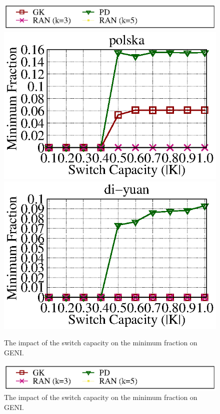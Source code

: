 \documentclass[a4paper,12pt]{report}
\begin{document}
\begin{CJK*}{UTF8}{bkai}
\begin{large}
\begin{figure}[ht]
  \end{figure}
    \begin{figure}[ht]
    \caption{The impact of the switch capacity on the minimum fraction on GENI.}
	\centering
	  \includegraphics[width=1.0\textwidth]{lambda_legend.eps}
	  \includegraphics[width=1.0\textwidth]{polska_geni_lambda_e05.eps}
	  \includegraphics[width=1.0\textwidth]{di-yuan_geni_lambda_e05.eps}
  \end{figure}
  \begin{figure}[ht]
    \caption{The impact of the switch capacity on the minimum fraction on GENI.}
	\centering
	  \includegraphics[width=1.0\textwidth]{lambda_legend.eps}

\end{figure}
\end{large}
\end{CJK*}
\end{document}
